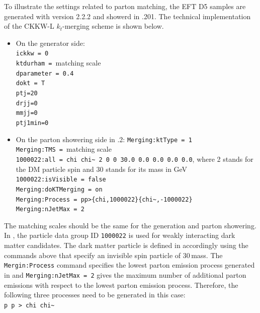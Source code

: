 To illustrate the settings related to parton matching, the EFT D5 samples are generated with \madgraph version 2.2.2 and showerd in \pythiaEight.201. The technical implementation of the CKKW-L $k_t$-merging scheme is shown below.
\begin{itemize}
\item On the generator side:\\
\texttt{ickkw = 0} \\
\texttt{ktdurham = }matching scale \\
\texttt{dparameter = 0.4} \\
\texttt{dokt = T} \\
\texttt{ptj=20} \\
\texttt{drjj=0} \\
\texttt{mmjj=0} \\
\texttt{ptj1min=0} \\

\item On the parton showering side in \pythiaEight.2:
\texttt{Merging:ktType           = 1}\\
\texttt{Merging:TMS              = }matching scale\\
\texttt{1000022:all = chi chi\~{ } 2 0 0 30.0 0.0 0.0 0.0 0.0}, where 2 stands for the DM particle spin and 30 stands for its mass in GeV\\
\texttt{1000022:isVisible = false}\\
\texttt{Merging:doKTMerging      = on}\\
\texttt{Merging:Process          = pp>\{chi,1000022\}\{chi\~{ },-1000022\}}\\
\texttt{Merging:nJetMax          = 2}\\
\end{itemize}
The matching scales should be the same for the generation and parton showering. In \madgraph, the particle data group ID \texttt{1000022} is used for weakly interacting dark matter candidates. The dark matter particle is defined in \pythiaEight accordingly using the commands above that specify an invisible spin \textonehalf{} particle of 30\,\gev mass. The \texttt{Mergin:Process} command specifies the lowest parton emission process generated in \madgraph and \texttt{Merging:nJetMax = 2} gives the maximum number of additional parton emissions with respect to the lowest parton emission process. Therefore, the following three processes need to be generated in this case:\\

\texttt{p p > chi chi\~{ }}\\

